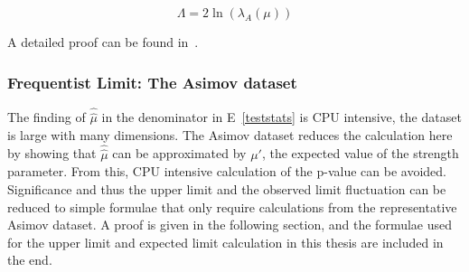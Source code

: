 \begin{equation}
    \Lambda=2\ln(\lambda_{A}(\mu))
    \label{eq:Lambda}
\end{equation}

A detailed proof can be found in~\cite{2011}. 










%
%
%
%





\subsubsection{Frequentist Limit: The Asimov dataset}
\label{sec:asimov}

The finding of $\hat{\hat{\mu}}$ in the denominator in E~\ref{teststats} is CPU intensive, the dataset is large with many dimensions. The Asimov dataset reduces the calculation here by showing that $\hat{\hat{\mu}}$ can be approximated by $\mu'$, the expected value of the strength parameter. From this, CPU intensive calculation of the p-value can be avoided. Significance and thus the upper limit and the observed limit fluctuation can be reduced to simple formulae that only
require calculations from the representative Asimov dataset. 
A proof is given in the following section, and the formulae used for the upper limit and expected limit calculation in this thesis are included in the end. 


